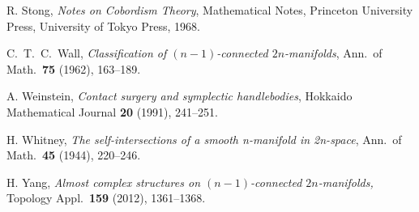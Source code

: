 \documentclass[12pt]{amsart}
\newcommand\Z{\mathbb{Z}}
\theoremstyle{remark}
\begin{document}
\begin{thebibliography}{999}
 R. Stong, 
{\em Notes on Cobordism Theory}, Mathematical Notes, Princeton University Press, 
University of Tokyo Press, 1968.

  
 C.~T.~C.~Wall, {\em Classification of $(n{-}1)$-connected $2n$-manifolds}, Ann.~of Math.~{\bf 75} (1962), 163--189.







 A. Weinstein, 
{\em Contact surgery and symplectic handlebodies}, Hokkaido
Mathematical Journal {\bf 20} (1991), 241--251.


 H. Whitney,
{\em The self-intersections of a smooth n{-}manifold in 2n{-}space},
Ann.~of Math.~{\bf 45} (1944), 220--246.

 H. Yang, {\em Almost complex structures on $(n{-}1)$-connected $2n$-manifolds,} Topology Appl.~{\bf 159} (2012), 1361--1368.

\end{thebibliography}
\end{document}
